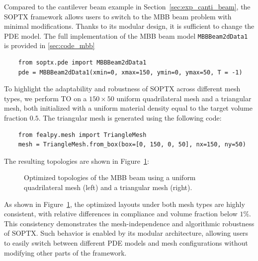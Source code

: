 \documentclass[mathpazo]{cicp}
\begin{document}
Compared to the cantilever beam example in Section~\ref{sec:exp_canti_beam}, the SOPTX framework allows users to switch to the MBB beam problem with minimal modifications. Thanks to its modular design, it is sufficient to change the PDE model. The full implementation of the MBB beam model \texttt{MBBBeam2dData1} is provided in \ref{sec:code_mbb}
\begin{lstlisting}
	from soptx.pde import MBBBeam2dData1
	pde = MBBBeam2dData1(xmin=0, xmax=150, ymin=0, ymax=50, T = -1)
\end{lstlisting}

To highlight the adaptability and robustness of SOPTX across different mesh types, we perform TO on a $150 \times 50$ uniform quadrilateral mesh and a triangular mesh, both initialized with a uniform material density equal to the target volume fraction $0.5$. The triangular mesh is generated using the following code:
\begin{lstlisting}
	from fealpy.mesh import TriangleMesh
	mesh = TriangleMesh.from_box(box=[0, 150, 0, 50], nx=150, ny=50)
\end{lstlisting}
The resulting topologies are shown in Figure~\ref{fig:mbb_2d_all}:
\begin{figure}[htp]
	\centering
	\caption{Optimized topologies of the MBB beam using a uniform quadrilateral mesh (left) and a triangular mesh (right).}
	\label{fig:mbb_2d_all}
\end{figure}

As shown in Figure~\ref{fig:mbb_2d_all}, the optimized layouts under both mesh types are highly consistent, with relative differences in compliance and volume fraction below $1\%$. This consistency demonstrates the mesh-independence and algorithmic robustness of SOPTX. Such behavior is enabled by its modular architecture, allowing users to easily switch between different PDE models and mesh configurations without modifying other parts of the framework.
\end{document}
